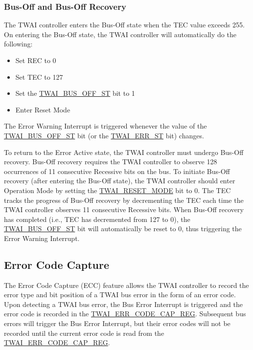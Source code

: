 \documentclass[main\_\_EN.tex]{subfiles}
\begin{document}
\subsubsection{Bus-Off and Bus-Off Recovery}

The TWAI controller enters the Bus-Off state when the TEC value exceeds 255. On entering the Bus-Off state, the TWAI controller will automatically do the following:

\begin{itemize}
    \item Set REC to 0
    \item Set TEC to 127
    \item Set the \hyperref[fielddesc:TWAIBUSOFFST]{TWAI\_BUS\_OFF\_ST} bit to 1
    \item Enter Reset Mode
\end{itemize}

The Error Warning Interrupt is triggered whenever the value of the \hyperref[fielddesc:TWAIBUSOFFST]{TWAI\_BUS\_OFF\_ST} bit (or the \hyperref[fielddesc:TWAIERRST]{TWAI\_ERR\_ST} bit) changes.

To return to the Error Active state, the TWAI controller must undergo Bus-Off recovery. Bus-Off recovery requires the TWAI controller to observe 128 occurrences of 11 consecutive Recessive bits on the bus. To initiate Bus-Off recovery (after entering the Bus-Off state), the TWAI controller should enter Operation Mode by setting the \hyperref[fielddesc:TWAIRESETMODE]{TWAI\_RESET\_MODE} bit to 0.
The TEC tracks the progress of Bus-Off recovery by decrementing the TEC each time the TWAI controller observes 11 consecutive Recessive bits. When Bus-Off recovery has completed (i.e., TEC has decremented from 127 to 0), the \hyperref[fielddesc:TWAIBUSOFFST]{TWAI\_BUS\_OFF\_ST} bit will automatically be reset to 0, thus triggering the Error Warning Interrupt.

\subsection{Error Code Capture}

The Error Code Capture (ECC) feature allows the TWAI controller to record the error type and bit position of a TWAI bus error in the form of an error code. Upon detecting a TWAI bus error, the Bus Error Interrupt is triggered and the error code is recorded in the \hyperref[regdesc:TWAIERRCODECAPREG]{TWAI\_ERR\_CODE\_CAP\_REG}. Subsequent bus errors will trigger the Bus Error Interrupt, but their error codes will not be recorded until the current error code is read from the \hyperref[regdesc:TWAIERRCODECAPREG]{TWAI\_ERR\_CODE\_CAP\_REG}.
\end{document}
